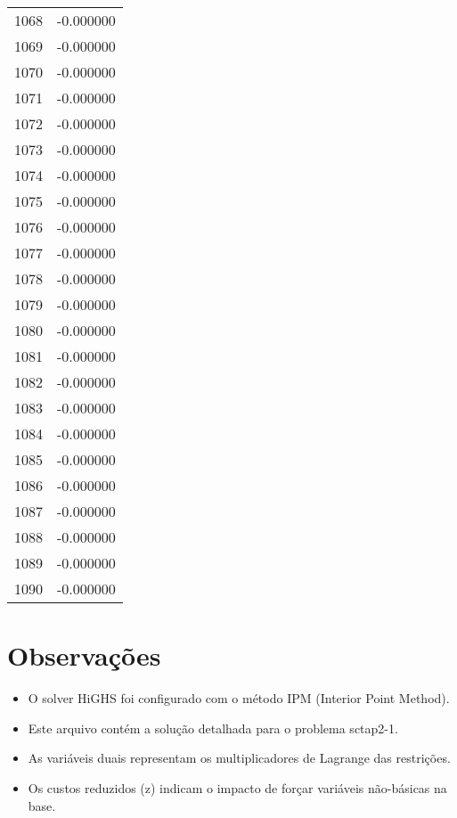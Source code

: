 \documentclass[12pt]{article}
\begin{document}
\begin{longtable}{@{}cc@{}}
1068 & -0.000000 \\
1069 & -0.000000 \\
1070 & -0.000000 \\
1071 & -0.000000 \\
1072 & -0.000000 \\
1073 & -0.000000 \\
1074 & -0.000000 \\
1075 & -0.000000 \\
1076 & -0.000000 \\
1077 & -0.000000 \\
1078 & -0.000000 \\
1079 & -0.000000 \\
1080 & -0.000000 \\
1081 & -0.000000 \\
1082 & -0.000000 \\
1083 & -0.000000 \\
1084 & -0.000000 \\
1085 & -0.000000 \\
1086 & -0.000000 \\
1087 & -0.000000 \\
1088 & -0.000000 \\
1089 & -0.000000 \\
1090 & -0.000000 \\

\end{longtable}


\section{Observações}

\begin{itemize}
\item O solver HiGHS foi configurado com o método IPM (Interior Point Method).
\item Este arquivo contém a solução detalhada para o problema sctap2-1.
\item As variáveis duais representam os multiplicadores de Lagrange das restrições.
\item Os custos reduzidos (z) indicam o impacto de forçar variáveis não-básicas na base.
\end{itemize}
\end{document}
